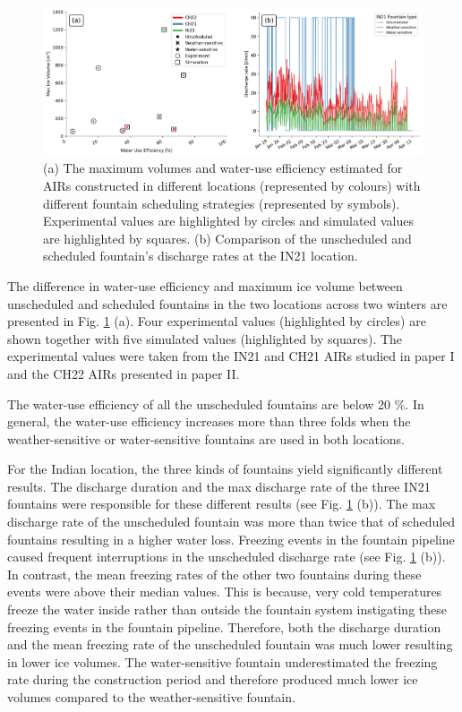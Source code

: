 \begin{figure}[htb]
\includegraphics[width=\textwidth]{figs/wue.png}

\caption{(a) The maximum volumes and water-use efficiency estimated for AIRs constructed in different locations
(represented by colours) with different fountain scheduling strategies (represented by symbols). Experimental
values are highlighted by circles and simulated values are highlighted by squares. (b) Comparison of
the unscheduled and scheduled fountain's discharge rates at the IN21 location.}

\label{fig:wue}
\end{figure}

The difference in water-use efficiency and maximum ice volume between unscheduled and scheduled fountains in the two
locations across two winters are presented in Fig. \ref{fig:wue} (a). Four experimental values (highlighted by
circles) are shown together with five simulated values (highlighted by squares).  The experimental values were
taken from the IN21 and CH21 AIRs studied in paper I and
the CH22 AIRs presented in paper II. 

The water-use efficiency of all the unscheduled fountains are below 20 \%. In general, the water-use efficiency
increases more than three folds when the weather-sensitive or water-sensitive fountains are used in both
locations.  

For the Indian location, the three kinds of fountains yield significantly different results.  The discharge
duration and the max discharge rate of the three IN21 fountains were responsible for these different results
(see Fig. \ref{fig:wue} (b)). The max discharge rate of the unscheduled fountain was more than twice that of
scheduled fountains resulting in a higher water loss. Freezing events in the fountain pipeline caused frequent
interruptions in the unscheduled discharge rate (see Fig. \ref{fig:wue} (b)). In contrast, the mean freezing
rates of the other two fountains during these events were above their median values. This is because, very cold
temperatures freeze the water inside rather than outside the fountain system instigating these freezing events in
the fountain pipeline. Therefore, both the discharge duration and the mean freezing rate of the unscheduled
fountain was much lower resulting in lower ice volumes. The water-sensitive fountain underestimated the freezing
rate during the construction period and therefore produced much lower ice volumes compared to the
weather-sensitive fountain. 

